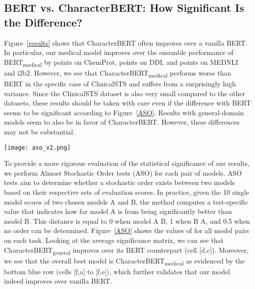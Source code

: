 \documentclass[11pt]{article}
\begin{document}
\subsection{BERT vs. CharacterBERT: How Significant Is the Difference?}

Figure~\ref{results} shows that CharacterBERT often improves over a vanilla BERT. In particular, our medical model improves over the ensemble performance of BERT\textsubscript{medical} by  points on ChemProt,  points on DDI, and  points on MEDNLI and i2b2. However, we see that CharacterBERT\textsubscript{medical} performs worse than BERT in the specific case of ClinicalSTS and suffers from a surprisingly high variance. Since the ClinicalSTS dataset is also very small compared to the other datasets, these results should be taken with care even if the difference with BERT seems to be significant according to Figure~\ref{ASO}. Results with general-domain models seem to also be in favor of CharacterBERT. However, these differences may not be substantial.

\begin{figure*}[h]
\begin{center}
\texttt{[image: aso\_v2.png]}
\end{center} 
\caption{Statistical significance: Minimal distance  for Almost Stochastic Order at level . Blue cells mean that the left model is significantly better than the bottom model. Red cells mean the opposite.} \label{ASO}
\end{figure*}

To provide a more rigorous evaluation of the statistical significance of our results, we perform Almost Stochastic Order tests (ASO) \cite{dror-etal-2019-deep} for each pair of models. ASO tests aim to determine whether a stochastic order exists between two models based on their respective sets of evaluation scores. In practice, given the 10 single model scores of two chosen models A and B, the method computes a test-specific value  that indicates how far model A is from being significantly better than model B. This distance  is equal to 0 when model A  B, 1 when B  A, and 0.5 when no order can be determined. Figure~\ref{ASO} shows the values of  for all model pairs on each task. Looking at the average significance matrix, we can see that CharacterBERT\textsubscript{general} improves over its BERT counterpart (cell [d,c]). Moreover, we see that the overall best model is CharacterBERT\textsubscript{medical} as evidenced by the bottom blue row (cells [f,a] to [f,e]), which further validates that our model indeed improves over vanilla BERT.
\end{document}
